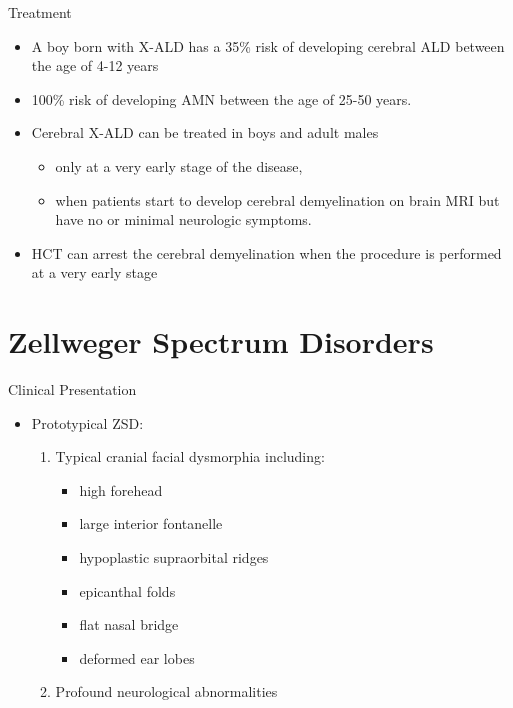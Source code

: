 \documentclass[presentation, smaller]{beamer}
\begin{document}
\begin{frame}[label={sec:org9884363}]{Treatment}
\begin{itemize}
\item A boy born with X-ALD has a 35\% risk of developing cerebral ALD
between the age of 4-12 years
\item 100\% risk of developing AMN between the age of 25-50 years.
\item Cerebral X-ALD can be treated in boys and adult males
\begin{itemize}
\item only at a very early stage of the disease,
\item when patients start to develop cerebral demyelination on brain MRI
but have no or minimal neurologic symptoms.
\end{itemize}
\item HCT can arrest the cerebral demyelination when the procedure is
performed at a very early stage
\end{itemize}
\end{frame}

\section{Zellweger Spectrum Disorders}
\label{sec:orge87d50c}
\begin{frame}[label={sec:orgf769a84}]{Clinical Presentation}
\begin{itemize}
\item Prototypical ZSD:
\begin{enumerate}
\item Typical cranial facial dysmorphia including:
\begin{itemize}
\item high forehead
\item large interior fontanelle
\item hypoplastic supraorbital ridges
\item epicanthal folds
\item flat nasal bridge
\item deformed ear lobes
\end{itemize}
\item Profound neurological abnormalities
\end{enumerate}
\end{itemize}
\end{frame}
\end{document}
